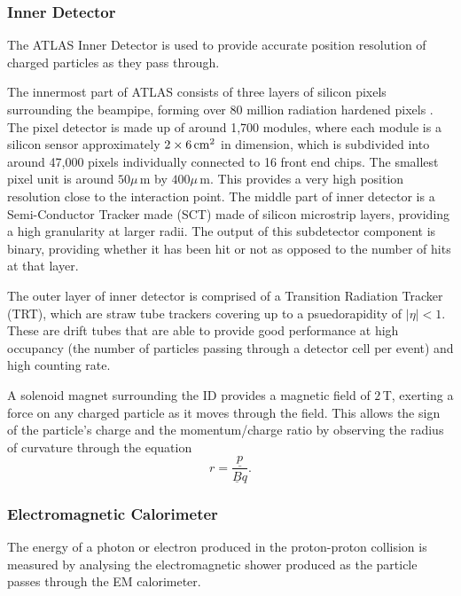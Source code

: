 \documentclass{article}
\begin{document}
\subsubsection{Inner Detector}
\label{sec:ATLAS_DetectorSchematics_ID}
The ATLAS Inner Detector is used to provide accurate position resolution of charged particles as they pass through. 

The innermost part of ATLAS consists of three layers of silicon pixels surrounding the beampipe, forming over 80 million radiation hardened pixels \cite{ATLASPixelDetector}. The pixel detector is made up of around 1,700 modules, where each module is a silicon sensor approximately $2\times6\,\rm{cm}^2$ in dimension, which is subdivided into around 47,000 pixels individually connected to 16 front end chips. The smallest pixel unit is around $50\mu\,$m by $400\mu\,$m. This provides a very high position resolution close to the interaction point. 
The middle part of inner detector is a Semi-Conductor Tracker made (SCT) made of silicon microstrip layers\cite{ATLASReview},  providing a high granularity at larger radii. The output of this subdetector component is binary, providing whether it has been hit or not as opposed to the number of hits at that layer.

The outer layer of inner detector is comprised of a Transition Radiation Tracker (TRT), which are straw tube trackers covering up to a psuedorapidity of $|\eta|<1$. These are drift tubes that are able to provide good performance at high occupancy (the number of particles passing through a detector cell per event) and high counting rate. 

A solenoid magnet surrounding the ID provides a magnetic field of $2\,$T, exerting a force on any charged particle as it moves through the field. This allows the sign of the particle's charge and the momentum/charge ratio by observing the radius of curvature through the equation 
\begin{equation} 
r = \frac{\underline{p}}{\underline{B}q}. 
\end{equation}


\subsubsection{Electromagnetic Calorimeter}
\label{sec:ATLAS_DetectorSchematics_ECAL}

The energy of a photon or electron produced in the proton-proton collision is measured by analysing the electromagnetic shower produced as the particle passes through the EM calorimeter. 
\end{document}
